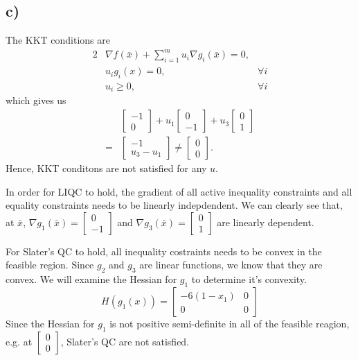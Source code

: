 \documentclass{article}
\begin{document}
\subsection*{c)}
	The KKT conditions are
	\begin{alignat}{2}
		&\nabla f(\bar{x}) + \sum_{i=1}^{m} u_i \nabla g_i(\bar{x}) = 0,\\
		& u_i g_i(x) = 0 , & \forall i \\
		& u_i \geq0, & \forall i
	\end{alignat}
	which gives us 
	\begin{align}
		&  \begin{bmatrix} -1 \\ 0 \end{bmatrix} + u_1 \begin{bmatrix} 0 \\ -1 \end{bmatrix} + u_3 \begin{bmatrix} 0 \\ 1 \end{bmatrix} \\
		= & \begin{bmatrix}-1 \\ u_3 - u_1 \end{bmatrix} \neq \begin{bmatrix}0 \\ 0 \end{bmatrix}.
	\end{align}
	Hence, KKT conditons are not satisfied for any $u$.
	
	In order for LIQC to hold, the gradient of all active inequality constraints and all equality constraints needs to be linearly indepdendent. We can clearly see that, at $\bar{x}$, $\nabla g_1(\bar{x}) = \begin{bmatrix} 0 \\ -1 \end{bmatrix}$ and  $\nabla g_3(\bar{x}) = \begin{bmatrix} 0 \\ 1 \end{bmatrix}$ are linearly dependent. 
	
	For Slater's QC to hold, all inequality costraints needs to be convex in the feasible region. Since $g_2$ and $g_3$ are linear functions, we know that they are convex. We will examine the Hessian for $g_1$ to determine it's convexity. 
	\begin{equation}
		H(g_1(x)) = \begin{bmatrix}
			-6(1-x_1) & 0 \\ 0 & 0
		\end{bmatrix}
	\end{equation}
	Since the Hessian for $g_1$ is not positive semi-definite in all of the feasible reagion, e.g. at $\begin{bmatrix} 0\\0	\end{bmatrix}$, Slater's QC are not satisfied.
\end{document}
